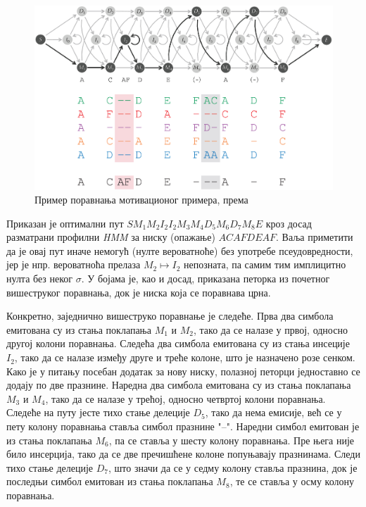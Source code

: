 \documentclass[12pt,oneside]{memoir}
\begin{document}
\begin{CJK}{UTF8}{ipxm}
\begin{figure}[H]
  \centering
  \includegraphics[width=\textwidth]{poravnanje.png}
  \caption{Пример поравнања мотивационог примера, према \cite{compeau2015}}
  \label{fig:poravnanje}
\end{figure}

Приказан је оптимални пут $S M_1 M_2 I_2 I_2 M_3 M_4 D_5 M_6 D_7 M_8 E$ кроз досад разматрани профилни \textit{HMM} за ниску (опажање) $ACAFDEAF$. Ваља приметити да је овај пут иначе немогућ (нулте вероватноће) без употребе псеудовредности, јер је нпр. вероватноћа прелаза $M_2 \mapsto I_2$ непозната, па самим тим имплицитно нулта без неког $\sigma$. У бојама је, као и досад, приказана петорка из почетног вишеструког поравнања, док је ниска која се поравнава црна.

Конкретно, заједнично вишеструко поравнање је следеће. Прва два симбола емитована су из стања поклапања $M_1$ и $M_2$, тако да се налазе у првој, односно другој колони поравнања. Следећа два симбола емитована су из стања инсеције $I_2$, тако да се налазе између друге и треће колоне, што је назначено розе сенком. Како је у питању посебан додатак за нову ниску, полазној петорци једноставно се додају по две празнине. Наредна два симбола емитована су из стања поклапања $M_3$ и $M_4$, тако да се налазе у трећој, односно четвртој колони поравнања. Следеће на путу јесте тихо стање делеције $D_5$, тако да нема емисије, већ се у пету колону поравнања ставља симбол празнине "--". Наредни симбол емитован је из стања поклапања $M_6$, па се ставља у шесту колону поравнања. Пре њега није било инсерција, тако да се две пречишћене колоне попуњавају празнинама. Следи тихо стање делеције $D_7$, што значи да се у седму колону ставља празнина, док је последњи симбол емитован из стања поклапања $M_8$, те се ставља у осму колону поравнања.


\end{CJK}
\end{document}
